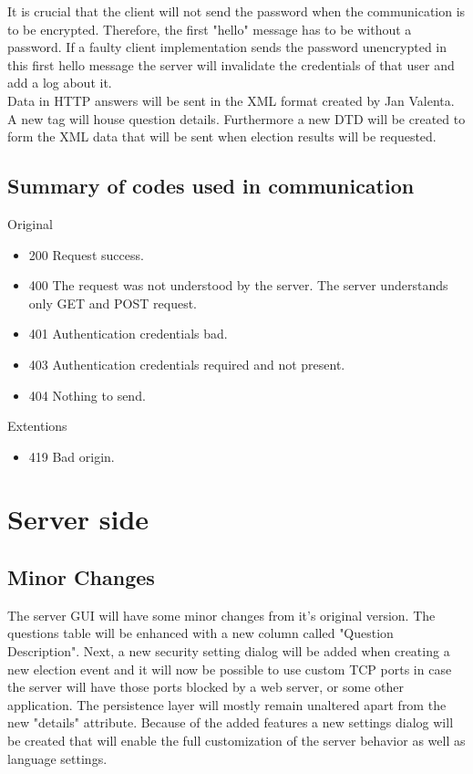 \documentclass[11pt,twoside,a4paper]{book}
\begin{document}
It is crucial that the client will not send the password when the communication is to be encrypted. Therefore, the first "hello" message has to be without a password. If a faulty client implementation sends the password unencrypted in this first hello message the server will invalidate the credentials of that user and add a log about it.\\

Data in HTTP answers will be sent in the XML format created by Jan Valenta. A new tag will house question details. Furthermore a new DTD will be created to form the XML data that will be sent when election results will be requested.

\subsection{Summary of codes used in communication}
Original\cite{bakalarkaJV}
\begin{itemize}
\item 200 Request success.
\item 400 The request was not understood by the server. The server understands only GET and POST request.
\item 401 Authentication credentials bad.
\item 403 Authentication credentials required and not present.
\item 404 Nothing to send.\\
\end{itemize}

Extentions
\begin{itemize}
\item 419 Bad origin.
\end{itemize}
\section{Server side}
\subsection{Minor Changes}
The server GUI will have some minor changes from it's original version. The questions table will be enhanced with a new column called "Question Description". Next, a new security setting dialog will be added when creating a new election event and it will now be possible to use custom TCP ports in case the server will  have those ports blocked by a web server, or some other application. The persistence layer will mostly remain unaltered apart from the new "details" attribute. Because of the added features a new settings dialog will be created that will enable the full customization of the server behavior as well as language settings.
\end{document}
